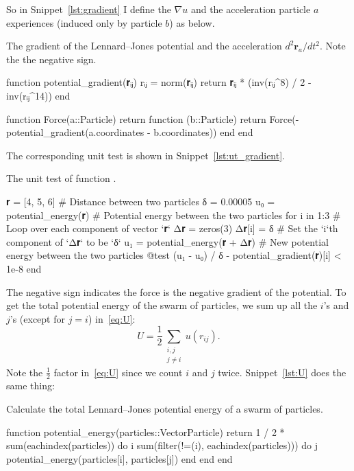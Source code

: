 %
So in Snippet~\ref{lst:gradient} I define the $\nabla u$ and the acceleration
particle $a$ experiences (induced only by particle $b$) as below.
%
\begin{algorithm}
    \caption{The gradient of the Lennard--Jones potential and the acceleration
        $d^2 \bm{r}_a / d t^2$. Note the the negative sign.}
    \label{lst:gradient}
    \begin{juliacode}
        function potential_gradient(𝐫ᵢⱼ)
            rᵢⱼ = norm(𝐫ᵢⱼ)
            return 𝐫ᵢⱼ * (inv(rᵢⱼ^8) / 2 - inv(rᵢⱼ^14))
        end

        function Force(a::Particle)
            return function (b::Particle)
                return Force(-potential_gradient(a.coordinates - b.coordinates))
            end
        end
    \end{juliacode}
\end{algorithm}
%
The corresponding unit test is shown in Snippet~\ref{lst:ut_gradient}.
%
\begin{algorithm}[H]
    \caption{The unit test of function .}
    \label{lst:ut_gradient}
    \begin{juliacode}
        𝐫 = [4, 5, 6]  # Distance between two particles
        δ = 0.00005
        u₀ = potential_energy(𝐫)  # Potential energy between the two particles
        for i in 1:3  # Loop over each component of vector `𝐫`
            Δ𝐫 = zeros(3)
            Δ𝐫[i] = δ  # Set the `i`th component of `Δ𝐫` to be `δ`
            u₁ = potential_energy(𝐫 + Δ𝐫)  # New potential energy between the two particles
            @test (u₁ - u₀) / δ - potential_gradient(𝐫)[i] < 1e-8
        end
    \end{juliacode}
\end{algorithm}
%
The negative sign indicates the force is the negative gradient of the potential.
To get the total potential energy of the swarm of particles, we sum up all the $i$'s
and $j$'s (except for $j = i$) in~\eqref{eq:U}:
%
\begin{equation}\label{eq:U}
    U = \frac{ 1 }{ 2 }\sum_{\substack{i, j\\ j \neq i}} u(r_{ij}).
\end{equation}
%
Note the $\frac{ 1 }{ 2 }$ factor in~\eqref{eq:U} since we count $i$ and $j$ twice.
Snippet~\ref{lst:U} does the same thing:

\begin{algorithm}[H]
    \caption{Calculate the total Lennard--Jones potential energy of a swarm of particles.}
    \label{lst:U}
    \begin{juliacode}
        function potential_energy(particles::Vector{Particle})
            return 1 / 2 * sum(eachindex(particles)) do i
                sum(filter(!=(i), eachindex(particles))) do j
                    potential_energy(particles[i], particles[j])
                end
            end
        end
    \end{juliacode}
\end{algorithm}


